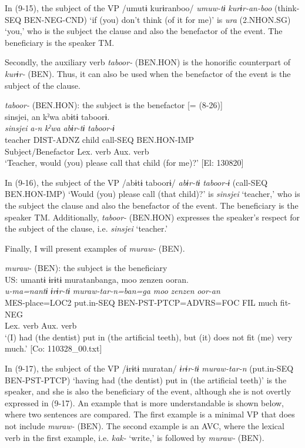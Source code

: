 In (9-15), the subject of the VP /umutɨ kurɨranboo/ \textit{umuw-tɨ} \textit{kurɨr-an-boo} (think-SEQ BEN-NEG-CND) ‘if (you) don’t think (of it for me)’ is \textit{ura} (2.NHON.SG) ‘you,’ who is the subject the clause and also the benefactor of the event. The beneficiary is the speaker TM.

  Secondly, the auxiliary verb \textit{taboor-} (BEN.HON) is the honorific counterpart of \textit{kurɨr-} (BEN). Thus, it can also be used when the benefactor of the event is the subject of the clause.

\ea   \textit{taboor-} (BEN.HON): the subject is the benefactor [= (8-26)]\label{ex:9.16}\\
 \gllll  {\textbar}sinsjei{\textbar},  an  kˀwa  abɨtɨ  taboorɨ.\\
    \textit{sinsjei}  \textit{a-n}  \textit{kˀwa}  \textit{abɨr-tɨ}  \textit{taboor{}-ɨ}\\
    teacher  DIST-ADNZ  child  call-SEQ  BEN.HON-IMP\\
    Subject/Benefactor      Lex. verb  Aux. verb\\
    \glt     ‘Teacher, would (you) please call that child (for me)?’ [El: 130820]
\z

In (9-16), the subject of the VP /abɨtɨ taboorɨ/ \textit{abɨr-tɨ} \textit{taboor-ɨ} (call-SEQ BEN.HON-IMP) ‘Would (you) please call (that child)?’ is \textit{sinsjei} ‘teacher,’ who is the subject the clause and also the benefactor of the event. The beneficiary is the speaker TM. Additionally, \textit{taboor-} (BEN.HON) expresses the speaker’s respect for the subject of the clause, i.e. \textit{sinsjei} ‘teacher.’

Finally, I will present examples of \textit{muraw-} (BEN).

\ea   \textit{muraw-} (BEN): the subject is the beneficiary\label{ex:9.17}\\
\gllll  US:  umantɨ  ɨrɨtɨ  muratanbanga,  {\textbar}moo  zenzen{\textbar}  ooran.    \\
    \textit{u-ma=nantɨ}  \textit{ɨrɨr-tɨ}  \textit{muraw{}-tar-n=ban=ga  moo}   \textit{zenzen}  \textit{oor-an}    \\
    MES-place=LOC2  put.in-SEQ  BEN-PST-PTCP=ADVRS=FOC  FIL   much  fit-NEG    \\
      Lex. verb  Aux. verb     \\
    \glt     ‘(I) had (the dentist) put in (the artificial teeth), but (it) does not fit (me) very much.’ [Co: 110328\_00.txt]
\z

In (9-17), the subject of the VP /ɨrɨtɨ muratan/ \textit{ɨrɨr-tɨ} \textit{muraw-tar-n} (put.in-SEQ BEN-PST-PTCP) ‘having had (the dentist) put in (the artificial teeth)’ is the speaker, and she is also the beneficiary of the event, although she is not overtly expressed in (9-17). An example that is more understandable is shown below, where two sentences are compared. The first example is a minimal VP that does not include \textit{muraw-} (BEN). The second example is an AVC, where the lexical verb in the first example, i.e. \textit{kak-} ‘write,’ is followed by \textit{muraw-} (BEN).

